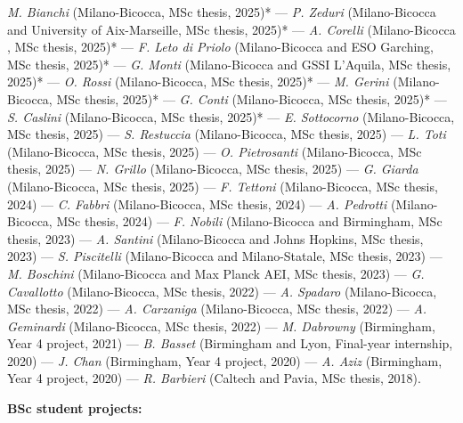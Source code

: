 \textit{M. Bianchi} (Milano-Bicocca, MSc thesis, 2025)* --- 
\textit{P. Zeduri} (Milano-Bicocca and University of Aix-Marseille, MSc thesis, 2025)* --- 
\textit{A. Corelli} (Milano-Bicocca , MSc thesis, 2025)* --- 
\textit{F. Leto di Priolo} (Milano-Bicocca and ESO Garching, MSc thesis, 2025)* --- 
\textit{G. Monti} (Milano-Bicocca and GSSI L'Aquila, MSc thesis, 2025)* --- 
\textit{O. Rossi} (Milano-Bicocca, MSc thesis, 2025)* --- 
\textit{M. Gerini} (Milano-Bicocca, MSc thesis, 2025)* --- 
\textit{G. Conti} (Milano-Bicocca, MSc thesis, 2025)* --- 
\textit{S. Caslini} (Milano-Bicocca, MSc thesis, 2025)* --- 
\textit{E. Sottocorno} (Milano-Bicocca, MSc thesis, 2025) --- 
\textit{S. Restuccia} (Milano-Bicocca, MSc thesis, 2025) --- 
\textit{L. Toti} (Milano-Bicocca, MSc thesis, 2025) --- 
\textit{O. Pietrosanti} (Milano-Bicocca, MSc thesis, 2025) --- 
\textit{N. Grillo} (Milano-Bicocca, MSc thesis, 2025) --- 
\textit{G. Giarda} (Milano-Bicocca, MSc thesis, 2025) --- 
\textit{F. Tettoni} (Milano-Bicocca, MSc thesis, 2024) --- 
\textit{C. Fabbri} (Milano-Bicocca, MSc thesis, 2024) --- 
\textit{A. Pedrotti} (Milano-Bicocca, MSc thesis, 2024) --- 
\textit{F. Nobili} (Milano-Bicocca and Birmingham, MSc thesis, 2023) --- 
\textit{A. Santini} (Milano-Bicocca and Johns Hopkins, MSc thesis, 2023) --- 
\textit{S. Piscitelli} (Milano-Bicocca and Milano-Statale, MSc thesis, 2023) --- 
\textit{M. Boschini} (Milano-Bicocca and Max Planck AEI, MSc thesis, 2023) --- 
\textit{G. Cavallotto} (Milano-Bicocca, MSc thesis, 2022) --- 
\textit{A. Spadaro} (Milano-Bicocca, MSc thesis, 2022) --- 
\textit{A. Carzaniga} (Milano-Bicocca, MSc thesis, 2022) --- 
\textit{A. Geminardi} (Milano-Bicocca, MSc thesis, 2022) --- 
\textit{M. Dabrowny} (Birmingham, Year 4 project, 2021) --- 
\textit{B. Basset} (Birmingham and Lyon, Final-year internship, 2020) --- 
\textit{J. Chan} (Birmingham, Year 4 project, 2020) --- 
\textit{A. Aziz} (Birmingham, Year 4 project, 2020) --- 
\textit{R. Barbieri} (Caltech and Pavia, MSc thesis, 2018).

\vspace{0.2cm}
\textbf{BSc student projects:}

